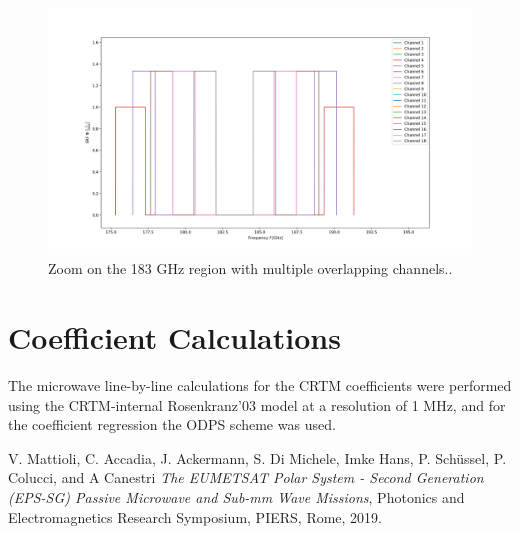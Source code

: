   \begin{figure}[H]
 \centering
 \includegraphics[width=\textwidth]{graphics/mwi_boxcar_zoom_183GHz.png}
 \caption{Zoom on the 183 GHz region with multiple overlapping channels..}
 \label{fig:boxcar3}
 \end{figure}
 
 \section{Coefficient Calculations}
 
 The microwave line-by-line calculations for the CRTM coefficients were performed using the CRTM-internal Rosenkranz'03 model at a resolution of 1 MHz, and for the coefficient regression the ODPS scheme was used.
 
\clearpage



\begin{thebibliography}{9}

  V. Mattioli, C. Accadia, J. Ackermann, S. Di Michele, Imke Hans, P. Sch\"ussel, P. Colucci, and A Canestri
  \textit{ The EUMETSAT Polar System - Second Generation (EPS-SG) Passive Microwave and Sub-mm Wave Missions},
  Photonics and Electromagnetics Research Symposium,
  PIERS, Rome,
  2019.
  
 \end{thebibliography}



